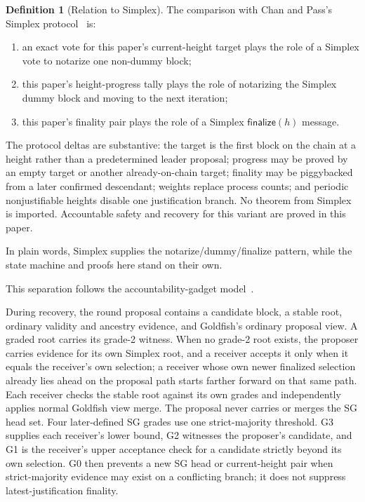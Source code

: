 \ifx\litemode\undefined\documentclass{article}\fi
\theoremstyle{plain}
\theoremstyle{definition}
\newtheorem{definition}{Definition}
\theoremstyle{remark}
\begin{document}
\begin{definition}[Relation to Simplex]\label{def:simplex-relation}
The comparison with Chan and Pass's Simplex protocol~\cite{simplex} is:
\begin{enumerate}
 \item an exact vote for this paper's current-height target plays the role of
 a Simplex vote to notarize one non-dummy block;
 \item this paper's height-progress tally plays the role of notarizing the
 Simplex dummy block and moving to the next iteration;
 \item this paper's finality pair plays the role of a Simplex
 \(\mathsf{finalize}(h)\) message.
\end{enumerate}
The protocol deltas are substantive: the target is the first block on the
chain at a height rather than a predetermined leader proposal; progress may
be proved by an empty target or another already-on-chain target; finality may
be piggybacked from a later confirmed descendant; weights replace process
counts; and periodic nonjustifiable heights disable one justification branch.
No theorem from Simplex is imported.  Accountable safety and
recovery for this variant are proved in this paper.

In plain words, Simplex supplies the notarize/dummy/finalize pattern, while
the state machine and proofs here stand on their own.
\end{definition}

This separation follows the accountability-gadget
model~\cite{accountability}.

During recovery, the round proposal contains a candidate block, a stable
root, ordinary validity and ancestry evidence, and Goldfish's ordinary
proposal view.  A graded root carries its grade-2 witness.  When no grade-2
root exists, the proposer carries evidence for its own Simplex root, and
a receiver accepts it only when it equals the receiver's own selection;
a receiver whose own newer finalized selection already lies ahead on the
proposal path starts farther forward on that same path.  Each receiver checks the stable root against its own grades
and independently applies normal Goldfish view merge.  The proposal
never carries or merges the SG head set.  Four
later-defined SG grades use one strict-majority threshold.  G3 supplies each
receiver's lower bound, G2 witnesses the proposer's candidate, and G1 is the
receiver's upper acceptance check for a candidate strictly beyond its
own selection.  G0 then prevents
a new SG head or current-height pair when strict-majority evidence may exist
on a conflicting branch; it does not suppress latest-justification finality.
\end{document}
